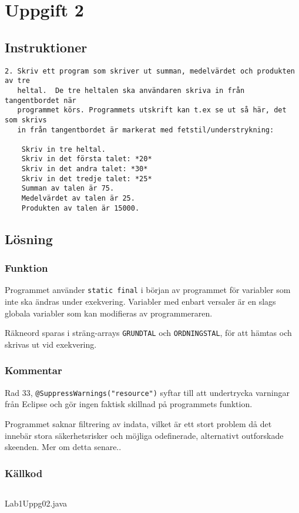 \section{Uppgift 2}\label{uppgift-2}

\subsection{Instruktioner}
\begin{verbatim}
2. Skriv ett program som skriver ut summan, medelvärdet och produkten av tre
   heltal.  De tre heltalen ska användaren skriva in från tangentbordet när
   programmet körs. Programmets utskrift kan t.ex se ut så här, det som skrivs
   in från tangentbordet är markerat med fetstil/understrykning:

    Skriv in tre heltal.
    Skriv in det första talet: *20*
    Skriv in det andra talet: *30*
    Skriv in det tredje talet: *25*
    Summan av talen är 75.
    Medelvärdet av talen är 25.
    Produkten av talen är 15000.
\end{verbatim}

\subsection{Lösning}
\subsubsection{Funktion}
Programmet använder \texttt{static final} i början av programmet för variabler
som inte ska ändras under exekvering.  Variabler med enbart versaler är en
slags globala variabler som kan modifieras av programmeraren.
\par Räkneord sparas i sträng-arrays \texttt{GRUNDTAL} och
\texttt{ORDNINGSTAL}, för att hämtas och skrivas ut vid exekvering.

\subsubsection{Kommentar}
\par Rad 33, \texttt{@SuppressWarnings("resource")} syftar till att undertrycka
varningar från Eclipse och gör ingen faktisk skillnad på programmets funktion.
\par Programmet saknar filtrering av indata, vilket är ett stort problem då det
innebär stora säkerhetsrisker och möjliga odefinerade, alternativt outforskade
skeenden. Mer om detta senare..

\subsubsection{Källkod}\label{uppgift-2_src}
    \inputminted[linenos]{java}{src/Lab1Uppg02.java}
    \caption{Lab1Uppg02.java}
    \label{Uppg2src}
